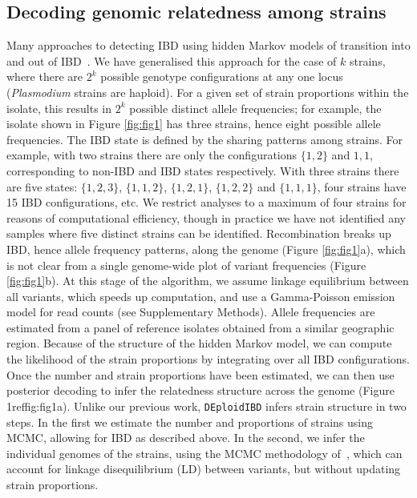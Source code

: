 \documentclass[9pt,lineno]{elife}
\begin{document}
\subsection{Decoding genomic relatedness among strains}

Many approaches to detecting IBD using hidden Markov models of transition into and out of IBD~\citep{Chang2015, Gusev2009, Gusev2011}.  We have generalised this approach for the case of $k$ strains, where there are $2^k$ possible genotype configurations at any one locus ({\it Plasmodium} strains are haploid).  For a given set of strain proportions within the isolate, this results in $2^k$ possible distinct allele frequencies; for example, the isolate shown in Figure \ref{fig:fig1} has three strains, hence eight possible allele frequencies.  The IBD state is defined by the sharing patterns among strains.  For example, with two strains there are only the configurations $\{1,2\}$ and ${1,1}$, corresponding to non-IBD and IBD states respectively.  With three strains there are five states: $\{1,2,3\}$, $\{1,1,2\}$, $\{1,2,1\}$, $\{1,2,2\}$ and $\{1,1,1\}$, four strains have 15 IBD configurations, etc.  We restrict analyses to a maximum of four strains for reasons of computational efficiency, though in practice we have not identified any samples where five distinct strains can be identified.  Recombination breaks up IBD, hence allele frequency patterns, along the genome (Figure \ref{fig:fig1}a), which is not clear from a single genome-wide plot of variant frequencies (Figure \ref{fig:fig1}b).  At this stage of the algorithm, we assume linkage equilibrium between all variants, which speeds up computation, and use a Gamma-Poisson emission model for read counts (see Supplementary Methods).  Allele frequencies are estimated from a panel of reference isolates obtained from a similar geographic region.  Because of the structure of the hidden Markov model, we can compute the likelihood of the strain proportions by integrating over all IBD configurations.  Once the number and strain proportions have been estimated, we can then use posterior decoding to infer the relatedness structure across the genome (Figure 1ref{fig:fig1}a).
Unlike our previous work, \texttt{DEploidIBD} infers strain structure in two steps.  In the first we estimate the number and proportions of strains using MCMC, allowing for IBD as described above.  In the second, we infer the individual genomes of the strains, using the MCMC methodology of~\citet{Zhu2017}, which can account for linkage disequilibrium (LD) between variants, but without updating strain proportions.
\end{document}
